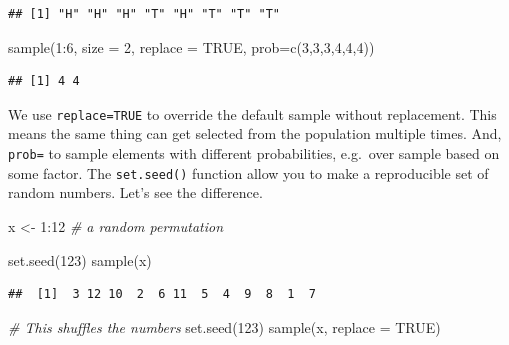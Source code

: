 \documentclass[
]{book}
\newenvironment{Shaded}{\begin{snugshade}}{\end{snugshade}}
\newcommand{\AttributeTok}[1]{\textcolor[rgb]{0.77,0.63,0.00}{#1}}
\newcommand{\CommentTok}[1]{\textcolor[rgb]{0.56,0.35,0.01}{\textit{#1}}}
\newcommand{\ConstantTok}[1]{\textcolor[rgb]{0.00,0.00,0.00}{#1}}
\newcommand{\DecValTok}[1]{\textcolor[rgb]{0.00,0.00,0.81}{#1}}
\newcommand{\FunctionTok}[1]{\textcolor[rgb]{0.00,0.00,0.00}{#1}}
\newcommand{\NormalTok}[1]{#1}
\newcommand{\OtherTok}[1]{\textcolor[rgb]{0.56,0.35,0.01}{#1}}
\newcommand{\SpecialCharTok}[1]{\textcolor[rgb]{0.00,0.00,0.00}{#1}}
\theoremstyle{definition}
\theoremstyle{definition}
\theoremstyle{definition}
\theoremstyle{definition}
\theoremstyle{remark}
\begin{document}
\begin{verbatim}
## [1] "H" "H" "H" "T" "H" "T" "T" "T"
\end{verbatim}

\begin{Shaded}
\begin{Highlighting}[]
\FunctionTok{sample}\NormalTok{(}\DecValTok{1}\SpecialCharTok{:}\DecValTok{6}\NormalTok{, }\AttributeTok{size =} \DecValTok{2}\NormalTok{, }\AttributeTok{replace =} \ConstantTok{TRUE}\NormalTok{, }\AttributeTok{prob=}\FunctionTok{c}\NormalTok{(}\DecValTok{3}\NormalTok{,}\DecValTok{3}\NormalTok{,}\DecValTok{3}\NormalTok{,}\DecValTok{4}\NormalTok{,}\DecValTok{4}\NormalTok{,}\DecValTok{4}\NormalTok{))}
\end{Highlighting}
\end{Shaded}

\begin{verbatim}
## [1] 4 4
\end{verbatim}

We use \texttt{replace=TRUE} to override the default sample without replacement. This means the same thing can get selected from the population multiple times. And, \texttt{prob=} to sample elements with different probabilities, e.g.~over sample based on some factor. The \texttt{set.seed()} function allow you to make a reproducible set of random numbers. Let's see the difference.

\begin{Shaded}
\begin{Highlighting}[]
\NormalTok{x }\OtherTok{\textless{}{-}} \DecValTok{1}\SpecialCharTok{:}\DecValTok{12}
\CommentTok{\# a random permutation}

\FunctionTok{set.seed}\NormalTok{(}\DecValTok{123}\NormalTok{)}
\FunctionTok{sample}\NormalTok{(x)}
\end{Highlighting}
\end{Shaded}

\begin{verbatim}
##  [1]  3 12 10  2  6 11  5  4  9  8  1  7
\end{verbatim}

\begin{Shaded}
\begin{Highlighting}[]
\CommentTok{\# This shuffles the numbers}
\FunctionTok{set.seed}\NormalTok{(}\DecValTok{123}\NormalTok{)}
\FunctionTok{sample}\NormalTok{(x, }\AttributeTok{replace =} \ConstantTok{TRUE}\NormalTok{)}
\end{Highlighting}
\end{Shaded}
\end{document}
